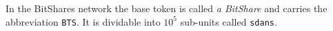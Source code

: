 In the BitShares network the base token is called \emph{a BitShare} and carries
the abbreviation \texttt{BTS}. It is dividable into $10^5$ sub-units called
\texttt{sdans}. %
